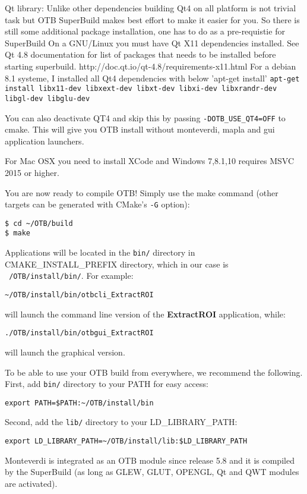 Qt library: Unlike other dependencies building Qt4 on all platform is not trivial task but
OTB SuperBuild makes best effort to make it easier for you. So there is still
some additional package installation, one has to do as a pre-requistie for SuperBuild
On a GNU/Linux you must have Qt X11 dependencies installed.
See Qt 4.8 documentation for list of packages that needs to be installed
before starting superbuild. http://doc.qt.io/qt-4.8/requirements-x11.html
For a debian 8.1 systeme, I installed all Qt4 dependencies with below 'apt-get install'
\texttt{apt-get install libx11-dev libxext-dev libxt-dev libxi-dev libxrandr-dev libgl-dev libglu-dev}

You can also deactivate QT4 and skip this by passing \texttt{-DOTB\_USE\_QT4=OFF} to cmake.
This will give you OTB install without monteverdi, mapla and gui application launchers.

For Mac OSX you need to install XCode and Windows 7,8.1,10 requires MSVC 2015 or higher.

You are now ready to compile OTB!
Simply use the make command (other targets can be generated with CMake's \texttt{-G} option):
\begin{verbatim}
$ cd ~/OTB/build
$ make
\end{verbatim}

Applications will be located in the \texttt{bin/} directory
in CMAKE\_INSTALL\_PREFIX
directory, which in our case is \texttt{~/OTB/install/bin/}. For example:
\begin{verbatim}
~/OTB/install/bin/otbcli_ExtractROI
\end{verbatim}
will launch the command line version of the \textbf{ExtractROI} application,
while:
\begin{verbatim}
./OTB/install/bin/otbgui_ExtractROI
\end{verbatim}
will launch the graphical version.

To be able to use your OTB build from everywhere, we recommend the following.
First, add \texttt{bin/} directory to your PATH for easy access:
\begin{verbatim}
export PATH=$PATH:~/OTB/install/bin
\end{verbatim}

Second, add the \texttt{lib/} directory to your LD\_LIBRARY\_PATH:
\begin{verbatim}
export LD_LIBRARY_PATH=~/OTB/install/lib:$LD_LIBRARY_PATH
\end{verbatim}

Monteverdi is integrated as an OTB module since release 5.8 and it is compiled
by the SuperBuild (as long as GLEW, GLUT, OPENGL, Qt and QWT modules are
activated).

